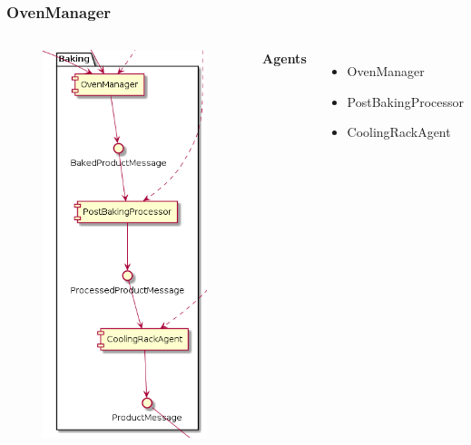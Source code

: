 \documentclass{beamer}
\begin{document}
\begin{frame}
    \frametitle{\huge{OvenManager}}
    \begin{columns}[t]
        \begin{figure}[H]
            \centering
            \includegraphics[width=0.6\linewidth]{baking_component_diagram.png}
        \end{figure}
            \textbf{Agents}
            \begin{itemize}
                \item OvenManager
                \item PostBakingProcessor
                \item CoolingRackAgent
            \end{itemize}
    \end{columns}
\end{frame}
\end{document}
